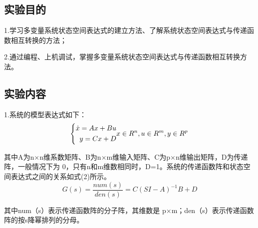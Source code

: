 \documentclass[UTF8]{ctexart}
\begin{document}
\subsection{ 实验目的 }
\par 1.学习多变量系统状态空间表达式的建立方法、了解系统状态空间表达式与传递函数相互转换的方法； 
\par 2.通过编程、上机调试，掌握多变量系统状态空间表达式与传递函数相互转换方法。
\subsection{实验内容 }
\par 1.系统的模型表达式如下：
\begin{equation}
   \left  \{\begin{aligned}
      \dot x=Ax+Bu    \\
      y=Cx+D     \\
        \end{aligned}\\
        x\in{R^{n}},u\in{R^{m}},y\in{R^{p}}\\
    \right.
 \end{equation}
 
\par 其中A为n×n维系数矩阵、B为n×m维输入矩阵、C为p×n维输出矩阵，D为传递阵，一般情况下为 0，只有n和m维数相同时，D=1。系统的传递函数阵和状态空间表达式之间的关系如式(2)所示。
\begin{equation}
G(s)= \frac {num(s)}{den(s)}=C(SI-A)^{-1}B+D
\end{equation}

\par 其中num（s）表示传递函数阵的分子阵，其维数是 p×m；den（s）表示传递函数阵的按s降幂排列的分母。
\end{document}

